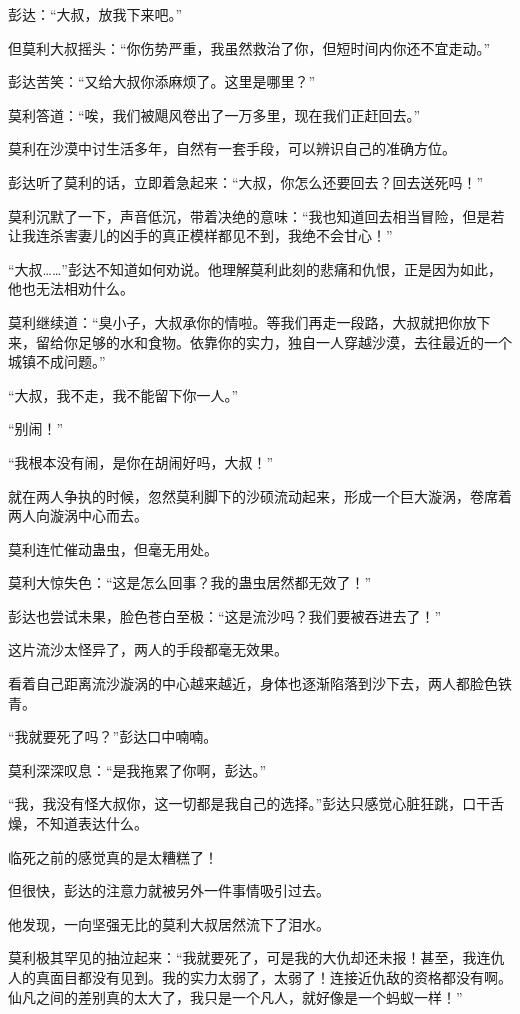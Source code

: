\begin{this_body}
彭达：“大叔，放我下来吧。”

但莫利大叔摇头：“你伤势严重，我虽然救治了你，但短时间内你还不宜走动。”

彭达苦笑：“又给大叔你添麻烦了。这里是哪里？”

莫利答道：“唉，我们被飓风卷出了一万多里，现在我们正赶回去。”

莫利在沙漠中讨生活多年，自然有一套手段，可以辨识自己的准确方位。

彭达听了莫利的话，立即着急起来：“大叔，你怎么还要回去？回去送死吗！”

莫利沉默了一下，声音低沉，带着决绝的意味：“我也知道回去相当冒险，但是若让我连杀害妻儿的凶手的真正模样都见不到，我绝不会甘心！”

“大叔……”彭达不知道如何劝说。他理解莫利此刻的悲痛和仇恨，正是因为如此，他也无法相劝什么。

莫利继续道：“臭小子，大叔承你的情啦。等我们再走一段路，大叔就把你放下来，留给你足够的水和食物。依靠你的实力，独自一人穿越沙漠，去往最近的一个城镇不成问题。”

“大叔，我不走，我不能留下你一人。”

“别闹！”

“我根本没有闹，是你在胡闹好吗，大叔！”

就在两人争执的时候，忽然莫利脚下的沙硕流动起来，形成一个巨大漩涡，卷席着两人向漩涡中心而去。

莫利连忙催动蛊虫，但毫无用处。

莫利大惊失色：“这是怎么回事？我的蛊虫居然都无效了！”

彭达也尝试未果，脸色苍白至极：“这是流沙吗？我们要被吞进去了！”

这片流沙太怪异了，两人的手段都毫无效果。

看着自己距离流沙漩涡的中心越来越近，身体也逐渐陷落到沙下去，两人都脸色铁青。

“我就要死了吗？”彭达口中喃喃。

莫利深深叹息：“是我拖累了你啊，彭达。”

“我，我没有怪大叔你，这一切都是我自己的选择。”彭达只感觉心脏狂跳，口干舌燥，不知道表达什么。

临死之前的感觉真的是太糟糕了！

但很快，彭达的注意力就被另外一件事情吸引过去。

他发现，一向坚强无比的莫利大叔居然流下了泪水。

莫利极其罕见的抽泣起来：“我就要死了，可是我的大仇却还未报！甚至，我连仇人的真面目都没有见到。我的实力太弱了，太弱了！连接近仇敌的资格都没有啊。仙凡之间的差别真的太大了，我只是一个凡人，就好像是一个蚂蚁一样！”


\end{this_body}
